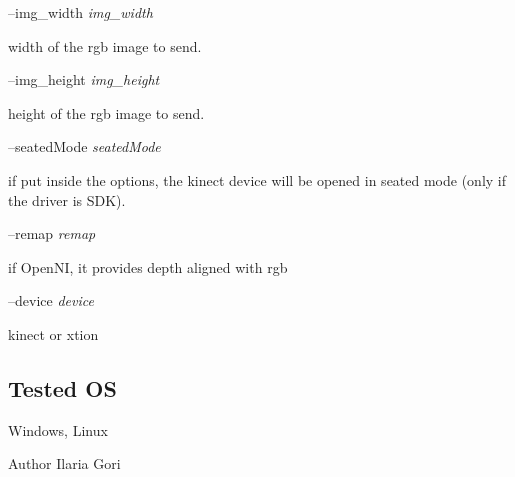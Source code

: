 --img\+\_\+width {\itshape img\+\_\+width} 
\begin{DoxyItemize}
\item width of the rgb image to send.
\end{DoxyItemize}

--img\+\_\+height {\itshape img\+\_\+height} 
\begin{DoxyItemize}
\item height of the rgb image to send.
\end{DoxyItemize}

--seated\+Mode {\itshape seated\+Mode} 
\begin{DoxyItemize}
\item if put inside the options, the kinect device will be opened in seated mode (only if the driver is S\+D\+K).
\end{DoxyItemize}

--remap {\itshape remap} 
\begin{DoxyItemize}
\item if Open\+N\+I, it provides depth aligned with rgb
\end{DoxyItemize}

--device {\itshape device} 
\begin{DoxyItemize}
\item kinect or xtion
\end{DoxyItemize}\hypertarget{group__kinectServer_tested_os_sec}{}\subsection{Tested O\+S}\label{group__kinectServer_tested_os_sec}
Windows, Linux

\begin{DoxyAuthor}{Author}
Ilaria Gori 
\end{DoxyAuthor}
